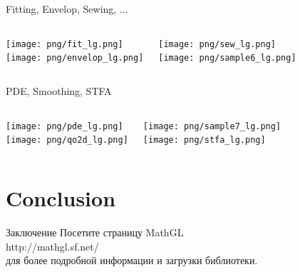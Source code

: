 \documentclass[color=usenames]{beamer}
\begin{document}
\begin{frame}{Fitting, Envelop, Sewing, ...}
\begin{columns}
\texttt{[image: png/fit\_lg.png]}\\
\texttt{[image: png/envelop\_lg.png]}

\texttt{[image: png/sew\_lg.png]}\\
\texttt{[image: png/sample6\_lg.png]}

\end{columns}
\end{frame}

\begin{frame}{PDE, Smoothing, STFA}
\begin{columns}
\texttt{[image: png/pde\_lg.png]}\\
\texttt{[image: png/qo2d\_lg.png]}

\texttt{[image: png/sample7\_lg.png]}\\
\texttt{[image: png/stfa\_lg.png]}

\end{columns}
\end{frame}

\section{Conclusion}
\begin{frame}{Заключение}
\LARGE
Посетите страницу MathGL\\[18pt]

http://mathgl.sf.net/\\[18pt]

для более подробной информации и загрузки библиотеки.
\end{frame}
\end{document}
